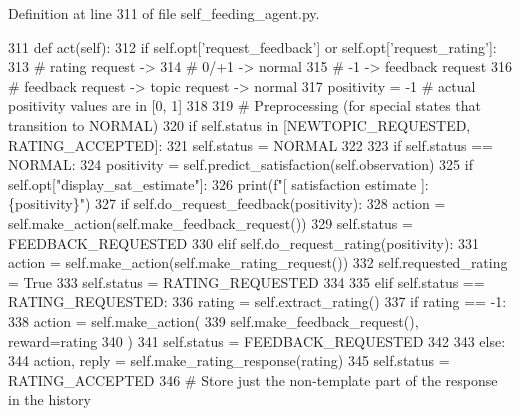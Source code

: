 Definition at line 311 of file self\+\_\+feeding\+\_\+agent.\+py.


\begin{DoxyCode}
311     \textcolor{keyword}{def }act(self):
312         \textcolor{keywordflow}{if} self.opt[\textcolor{stringliteral}{'request\_feedback'}] \textcolor{keywordflow}{or} self.opt[\textcolor{stringliteral}{'request\_rating'}]:
313             \textcolor{comment}{# rating request ->}
314             \textcolor{comment}{#   0/+1 -> normal}
315             \textcolor{comment}{#   -1 -> feedback request}
316             \textcolor{comment}{# feedback request -> topic request -> normal}
317             positivity = -1  \textcolor{comment}{# actual positivity values are in [0, 1]}
318 
319             \textcolor{comment}{# Preprocessing (for special states that transition to NORMAL)}
320             \textcolor{keywordflow}{if} self.status \textcolor{keywordflow}{in} [NEWTOPIC\_REQUESTED, RATING\_ACCEPTED]:
321                 self.status = NORMAL
322 
323             \textcolor{keywordflow}{if} self.status == NORMAL:
324                 positivity = self.predict\_satisfaction(self.observation)
325                 \textcolor{keywordflow}{if} self.opt[\textcolor{stringliteral}{"display\_sat\_estimate"}]:
326                     print(f\textcolor{stringliteral}{"[ satisfaction estimate ]: \{positivity\}"})
327                 \textcolor{keywordflow}{if} self.do\_request\_feedback(positivity):
328                     action = self.make\_action(self.make\_feedback\_request())
329                     self.status = FEEDBACK\_REQUESTED
330                 \textcolor{keywordflow}{elif} self.do\_request\_rating(positivity):
331                     action = self.make\_action(self.make\_rating\_request())
332                     self.requested\_rating = \textcolor{keyword}{True}
333                     self.status = RATING\_REQUESTED
334 
335             \textcolor{keywordflow}{elif} self.status == RATING\_REQUESTED:
336                 rating = self.extract\_rating()
337                 \textcolor{keywordflow}{if} rating == -1:
338                     action = self.make\_action(
339                         self.make\_feedback\_request(), reward=rating
340                     )
341                     self.status = FEEDBACK\_REQUESTED
342 
343                 \textcolor{keywordflow}{else}:
344                     action, reply = self.make\_rating\_response(rating)
345                     self.status = RATING\_ACCEPTED
346                     \textcolor{comment}{# Store just the non-template part of the response in the history}

\end{DoxyCode}
